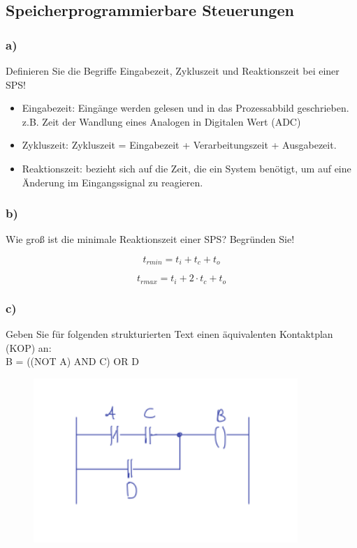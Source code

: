 \subsection{Speicherprogrammierbare Steuerungen}

\subsubsection{a)}
Definieren Sie die Begriffe Eingabezeit, Zykluszeit und Reaktionszeit bei einer SPS!

\begin{itemize}
  \item Eingabezeit: Eingänge werden gelesen und in das Prozessabbild geschrieben. z.B. Zeit der Wandlung eines Analogen in Digitalen Wert (ADC)
  \item Zykluszeit: Zykluszeit = Eingabezeit + Verarbeitungszeit + Ausgabezeit. 
  \item Reaktionszeit: bezieht sich auf die Zeit, die ein System benötigt, um auf eine Änderung im Eingangssignal zu reagieren.
\end{itemize}

\subsubsection{b)}
Wie groß ist die minimale Reaktionszeit einer SPS? Begründen Sie!

\begin{equation}
  t_{rmin} = t_i + t_c + t_o
\end{equation}

\begin{equation}
  t_{rmax} = t_i + 2\cdot t_c + t_o
\end{equation}


\subsubsection{c)}
Geben Sie für folgenden strukturierten Text einen äquivalenten Kontaktplan (KOP) an:\\
B = ((NOT A) AND C) OR D

\begin{figure}[H]
  \includegraphics[width=10cm]{images/KA280521/6c.PNG}
  \centering
\end{figure}